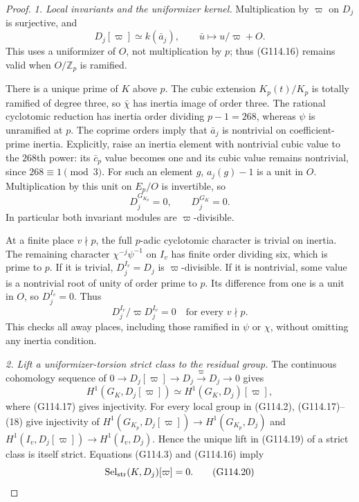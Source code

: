 \begin{proof}
\emph{1. Local invariants and the uniformizer kernel.}
Multiplication by $\varpi$ on $D_j$ is surjective, and
\[
 D_j[\varpi]\simeq k(\bar a_j),\qquad
 \bar u\longmapsto u/\varpi+O.
 \tag{G114.16}
\]
This uses a uniformizer of $O$, not multiplication by $p$;
thus (G114.16) remains valid when $O/\mathbb Z_p$ is ramified.

There is a unique prime of $K$ above $p$.
The cubic extension $K_p(t)/K_p$ is totally ramified of degree
three, so $\bar\chi$ has inertia image of order three.
The rational cyclotomic reduction has inertia order dividing
$p-1=268$, whereas $\psi$ is unramified at $p$.
The coprime orders imply that $\bar a_j$ is nontrivial on
coefficient-prime inertia.  Explicitly, raise an inertia element
with nontrivial cubic value to the $268$th power: its
$\bar c_p$ value becomes one and its cubic value remains
nontrivial, since $268\equiv1\pmod3$.
For such an element $g$, $a_j(g)-1$ is a unit in $O$.
Multiplication by this unit on $E_p/O$ is invertible, so
\[
                     D_j^{G_{K_p}}=0,
                     \qquad D_j^{G_K}=0.
 \tag{G114.17}
\]
In particular both invariant modules are $\varpi$-divisible.

At a finite place $v\nmid p$, the full $p$-adic cyclotomic
character is trivial on inertia.  The remaining character
$\chi^{-j}\psi^{-1}$ on $I_v$ has finite order dividing six,
which is prime to $p$.
If it is trivial, $D_j^{I_v}=D_j$ is $\varpi$-divisible.
If it is nontrivial, some value is a nontrivial root of unity
of order prime to $p$.  Its difference from one is a unit in
$O$, so $D_j^{I_v}=0$.
Thus
\[
             D_j^{I_v}/\varpi D_j^{I_v}=0
                         \quad\text{for every }v\nmid p.
 \tag{G114.18}
\]
This checks all away places, including those ramified in
$\psi$ or $\chi$, without omitting any inertia condition.

\emph{2. Lift a uniformizer-torsion strict class to the residual group.}
The continuous cohomology sequence of
$0\to D_j[\varpi]\to D_j\xrightarrow{\varpi}D_j\to0$
gives
\[
       H^1(G_K,D_j[\varpi])\simeq H^1(G_K,D_j)[\varpi],
 \tag{G114.19}
\]
where (G114.17) gives injectivity.
For every local group in (G114.2), (G114.17)--(18) give
injectivity of
$H^1(G_{K_p},D_j[\varpi])\to H^1(G_{K_p},D_j)$ and
$H^1(I_v,D_j[\varpi])\to H^1(I_v,D_j)$.
Hence the unique lift in (G114.19) of a strict class is itself
strict.  Equations (G114.3) and (G114.16) imply
\[
                \operatorname{Sel}_{\rm str}(K,D_j)[\varpi]=0.
 \tag{G114.20}
\]


\end{proof}
